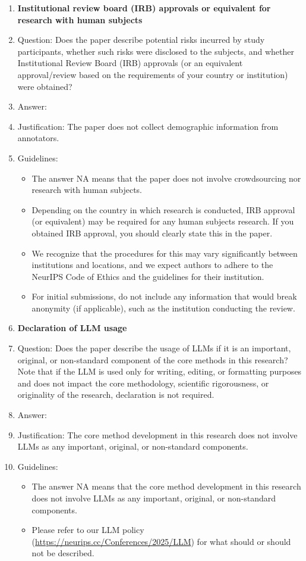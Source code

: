 \documentclass{article}
\begin{document}
\begin{enumerate}
\item {\bf Institutional review board (IRB) approvals or equivalent for research with human subjects}
    \item[] Question: Does the paper describe potential risks incurred by study participants, whether such risks were disclosed to the subjects, and whether Institutional Review Board (IRB) approvals (or an equivalent approval/review based on the requirements of your country or institution) were obtained?
    \item[] Answer: \answerNA{} %
    \item[] Justification: The paper does not collect demographic information from annotators.
    \item[] Guidelines:
    \begin{itemize}
        \item The answer NA means that the paper does not involve crowdsourcing nor research with human subjects.
        \item Depending on the country in which research is conducted, IRB approval (or equivalent) may be required for any human subjects research. If you obtained IRB approval, you should clearly state this in the paper. 
        \item We recognize that the procedures for this may vary significantly between institutions and locations, and we expect authors to adhere to the NeurIPS Code of Ethics and the guidelines for their institution. 
        \item For initial submissions, do not include any information that would break anonymity (if applicable), such as the institution conducting the review.
    \end{itemize}

\item {\bf Declaration of LLM usage}
    \item[] Question: Does the paper describe the usage of LLMs if it is an important, original, or non-standard component of the core methods in this research? Note that if the LLM is used only for writing, editing, or formatting purposes and does not impact the core methodology, scientific rigorousness, or originality of the research, declaration is not required.
    \item[] Answer: \answerNA{} %
    \item[] Justification: The core method development in this research does not involve LLMs as any important, original, or non-standard components.
    \item[] Guidelines:
    \begin{itemize}
        \item The answer NA means that the core method development in this research does not involve LLMs as any important, original, or non-standard components.
        \item Please refer to our LLM policy (\url{https://neurips.cc/Conferences/2025/LLM}) for what should or should not be described.
    \end{itemize}

\end{enumerate}

\fi


\newpage
\end{document}
